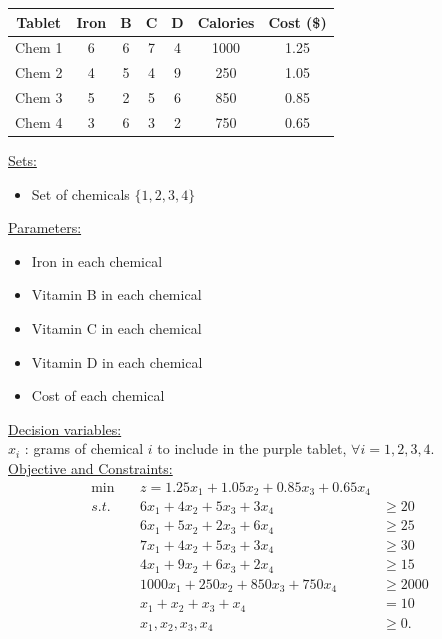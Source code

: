\begin{table}[h!] \begin{center} \begin{tabular} {|c|c|c|c|c|c|c|}
\hline Tablet  & Iron  &  B &  C &  D & Calories & Cost (\$) \\ \hline
\hline  Chem 1  & 6    & 6         & 7         & 4         &  1000    & 1.25 \\
\hline  Chem 2  & 4    & 5         & 4         & 9         &  250     & 1.05 \\
\hline  Chem 3  & 5    & 2         & 5         & 6         &  850     & 0.85 \\
\hline  Chem 4  & 3    & 6         & 3         & 2         &  750     & 0.65 \\
\hline
\end{tabular} \end{center} \end{table}


\begin{solution}

\smallskip \underline{Sets:}
\begin{itemize}
\item Set of chemicals $\{1,2,3,4\}$
\end{itemize}
\smallskip \underline{Parameters:}
\begin{itemize}
\item Iron in each chemical
\item Vitamin B in each chemical
\item Vitamin C in each chemical
\item Vitamin D in each chemical
\item Cost of each chemical
\end{itemize}
\smallskip \underline{Decision variables:} \\
$x_i$ : grams of chemical $i$ to include in the purple tablet, $\forall i = 1,2,3,4$.\\
\smallskip \underline{Objective and Constraints:}
\begin{align*}
\min\ && z = 1.25x_1 + 1.05x_2 + 0.85x_3 + 0.65x_4 \\
s.t. &&  6x_1 + 4x_2 + 5x_3 + 3x_4 &\ge 20 \\
&& 6x_1 + 5x_2 + 2x_3 + 6x_4 &\ge 25  \\
&& 7x_1 + 4x_2 + 5x_3 + 3x_4 &\ge 30  \\
&& 4x_1 + 9x_2 + 6x_3 + 2x_4 &\ge 15  \\
&& 1000x_1 + 250x_2 + 850x_3 + 750x_4 &\ge 2000 \\
&& x_1 + x_2 + x_3 + x_4 &= 10  \\
&& x_1, x_2, x_3, x_4 &\ge 0. 
\end{align*}

\end{solution}





